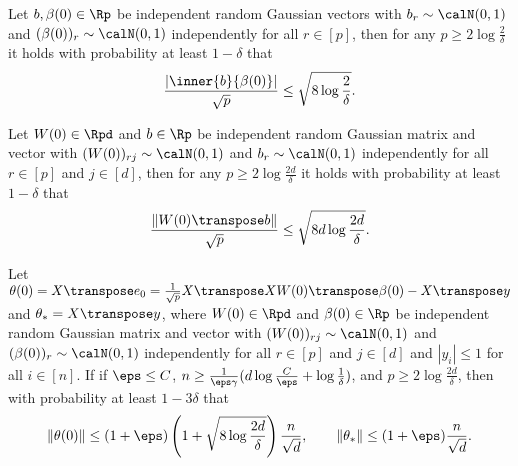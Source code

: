 \begin{lemma}\label{lem:inner-product-tail}
    Let $b,\beta(0)\in\Rp$ be independent random Gaussian vectors with $b_r\sim\calN(0,1)$ and $(\beta(0))_r\sim\calN(0,1)$ independently for all $r\in[p]$, then for any $p \geq 2\log\frac{2}{\delta}$ it holds with probability at least $1-\delta$ that
    \begin{align*}
        \frac{|\inner{b}{\beta(0)}|}{\sqrt{p}} \leq \sqrt{8\log\frac{2}{\delta}}.
    \end{align*}
\end{lemma}

\begin{corollary}\label{cor:W0-b-tail}
    Let $W(0)\in\Rpd$ and $b\in\Rp$ be independent random Gaussian matrix and vector with $(W(0))_{rj}\sim\calN(0,1)$ and $b_r\sim\calN(0,1)$ independently for all $r\in[p]$ and $j\in[d]$, then for any $p \geq 2\log\frac{2d}{\delta}$ it holds with probability at least $1-\delta$ that
    \begin{align*}
        \frac{\|W(0)\transpose b\|}{\sqrt{p}} \leq \sqrt{8d\log\frac{2d}{\delta}}.
    \end{align*}
\end{corollary}

\begin{corollary}\label{cor:theta-tail}
    Let $\theta(0) = X\transpose e_0 = \frac{1}{\sqrt{p}}X\transpose X W(0)\transpose\beta(0) - X\transpose y$ and $\theta_* = X\transpose y$, where $W(0)\in\Rpd$ and $\beta(0)\in\Rp$ be independent random Gaussian matrix and vector with $(W(0))_{rj}\sim\calN(0,1)$ and $(\beta(0))_r\sim\calN(0,1)$ independently for all $r\in[p]$ and $j\in[d]$ and $|y_i|\leq 1$ for all $i\in[n]$. If if $\eps \leq C$, $n \geq \frac{1}{\eps\gamma} (d\log\frac{C}{\eps} + \log\frac{1}{\delta})$, and $p \geq 2\log\frac{2d}{\delta}$, then with probability at least $1-3\delta$ that
    \begin{align*}
        \|\theta(0)\|\leq (1+\eps)\left(1 + \sqrt{8\log\frac{2d}{\delta}}\right)\frac{n}{\sqrt{d}}, \qquad \|\theta_*\|\leq (1+\eps)\frac{n}{\sqrt{d}}.
    \end{align*}
\end{corollary}

